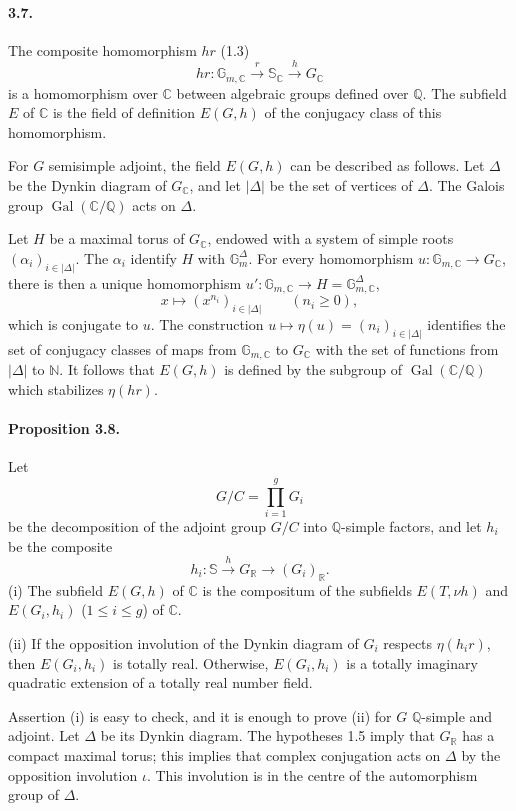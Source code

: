 \documentclass[10pt]{article}
\newcommand{\C}{\mathbb C}
\newcommand{\Gm}{\mathbb G_m}
\newcommand{\Q}{\mathbb Q}
\newcommand{\R}{\mathbb R}
\newcommand{\bS}{\mathbb S}
\newcommand{\Gal}{\operatorname{Gal}}
\begin{document}
\paragraph{3.7.} The composite homomorphism $hr$ (1.3)
\[
hr:\mathbb G_{m,\C}\xrightarrow{r}\bS_\C\xrightarrow{h}G_\C
\]
is a homomorphism over $\C$ between algebraic groups defined over $\Q$. The subfield $E$ of $\C$ is the field of definition $E(G,h)$ of the conjugacy class of this homomorphism.

For $G$ semisimple adjoint, the field $E(G,h)$ can be described as follows. Let $\Delta$ be the Dynkin diagram of $G_\C$, and let $|\Delta|$ be the set of vertices of $\Delta$. The Galois group $\Gal(\C/\Q)$ acts on $\Delta$.

Let $H$ be a maximal torus of $G_\C$, endowed with a system of simple roots $(\alpha_i)_{i\in |\Delta|}$. The $\alpha_i$ identify $H$ with $\Gm^{\Delta}$. For every homomorphism $u:\mathbb G_{m,\C}\to G_\C$, there is then a unique homomorphism $u':\mathbb G_{m,\C}\to H=\mathbb G_{m,\C}^{\Delta}$,
\[
x\longmapsto (x^{n_i})_{i\in |\Delta|}\qquad(n_i\ge0),
\]
which is conjugate to $u$. The construction $u\mapsto \eta(u)=(n_i)_{i\in |\Delta|}$ identifies the set of conjugacy classes of maps from $\mathbb G_{m,\C}$ to $G_\C$ with the set of functions from $|\Delta|$ to $\mathbb N$. It follows that $E(G,h)$ is defined by the subgroup of $\Gal(\C/\Q)$ which stabilizes $\eta(hr)$.

\paragraph{Proposition 3.8.} Let
\[
G/C=\prod_{i=1}^g G_i
\]
be the decomposition of the adjoint group $G/C$ into $\Q$-simple factors, and let $h_i$ be the composite
\[
h_i:\bS\xrightarrow{h}G_\R\longrightarrow (G_i)_\R.
\]
(i) The subfield $E(G,h)$ of $\C$ is the compositum of the subfields $E(T,\nu h)$ and $E(G_i,h_i)$ ($1\le i\le g$) of $\C$.

(ii) If the opposition involution of the Dynkin diagram of $G_i$ respects $\eta(h_ir)$, then $E(G_i,h_i)$ is totally real. Otherwise, $E(G_i,h_i)$ is a totally imaginary quadratic extension of a totally real number field.

Assertion (i) is easy to check, and it is enough to prove (ii) for $G$ $\Q$-simple and adjoint. Let $\Delta$ be its Dynkin diagram. The hypotheses 1.5 imply that $G_\R$ has a compact maximal torus; this implies that complex conjugation acts on $\Delta$ by the opposition involution $\iota$. This involution is in the centre of the automorphism group of $\Delta$.
\end{document}
